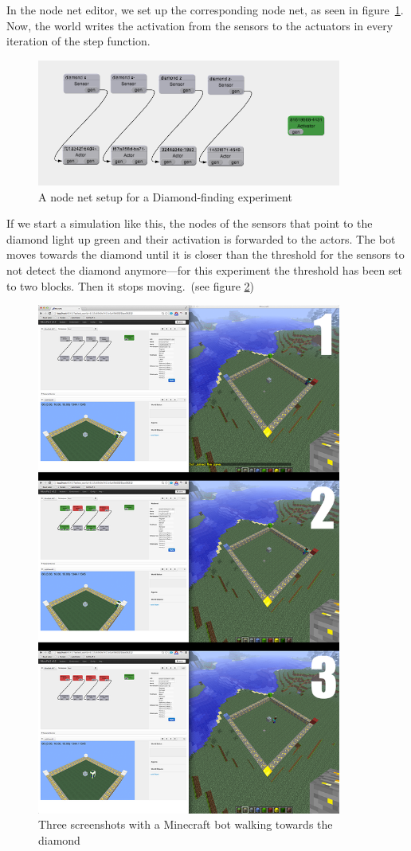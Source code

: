 In the node net editor, we set up the corresponding node net, as seen in figure~\ref{nodenet_setup}. Now, the world writes the activation from the sensors to the actuators in every iteration of the step function.

\begin{figure}[h]
  \centering
    \includegraphics[width=10cm]{graphics/nodenet_setup}
  \caption{A node net setup for a Diamond-finding experiment}
  \label{nodenet_setup}
\end{figure}

If we start a simulation like this, the nodes of the sensors that point to the diamond light up green and their activation is forwarded to the actors. The bot moves towards the diamond until it is closer than the threshold for the sensors to not detect the diamond anymore---for this experiment the threshold has been set to two blocks. Then it stops moving.~(see figure \ref{diamond_screens})

\begin{figure}[h]
  \centering
    \includegraphics[width=10cm]{graphics/diamond_screens}
  \caption{Three screenshots with a Minecraft bot walking towards the diamond}
  \label{diamond_screens}
\end{figure}

